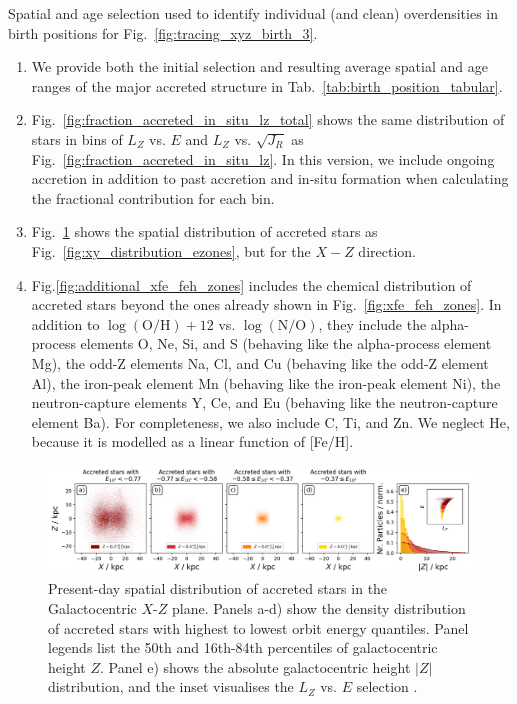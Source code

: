 \documentclass[fleqn,usenatbib]{mnras}
\begin{document}
\begin{table}
    \centering
    \caption{Spatial and age selection used to identify individual (and clean) overdensities in birth positions for Fig.~\ref{fig:tracing_xyz_birth_3}.}
    
    \label{tab:birth_position_tabular}
\end{table}

\begin{enumerate}[leftmargin=2em,labelwidth=0em]
    \item We provide both the initial selection and resulting average spatial and age ranges of the major accreted structure in Tab.~\ref{tab:birth_position_tabular}.
    \item Fig.~\ref{fig:fraction_accreted_in_situ_lz_total} shows the same distribution of stars in bins of $L_Z$ vs. $E$ and $L_Z$ vs. $\sqrt{J_R}$ as Fig.~\ref{fig:fraction_accreted_in_situ_lz}. In this version, we include ongoing accretion in addition to past accretion and in-situ formation when calculating the fractional contribution for each bin. 
    \item Fig.~\ref{fig:xz_distribution_ezones} shows the spatial distribution of accreted stars as Fig.~\ref{fig:xy_distribution_ezones}, but for the $X-Z$ direction.
      \item Fig.\ref{fig:additional_xfe_feh_zones} includes the chemical distribution of accreted stars beyond the ones already shown in Fig.~\ref{fig:xfe_feh_zones}. In addition to $\log(\mathrm{O/H}) + 12$ vs. $\log(\mathrm{N/O})$, they include the alpha-process elements O, Ne, Si, and S (behaving like the alpha-process element Mg), the odd-Z elements Na, Cl, and Cu (behaving like the odd-Z element Al), the iron-peak element Mn (behaving like the iron-peak element Ni), the neutron-capture elements Y, Ce, and Eu (behaving like the neutron-capture element Ba). For completeness, we also include C, Ti, and Zn. We neglect He, because it is modelled as a linear function of [Fe/H].
\end{enumerate}

\begin{figure}
    \centering
    \includegraphics[width=\textwidth]{figures/xz_distribution_ezones.png}
    \caption{Present-day spatial distribution of accreted stars in the Galactocentric $X$-$Z$ plane. Panels a-d) show the density distribution of accreted stars with highest to lowest orbit energy quantiles. Panel legends list the 50th and 16th-84th percentiles of galactocentric height $Z$. Panel e) shows the absolute galactocentric height $\vert Z \vert$ distribution, and the inset visualises the $L_Z$ vs. $E$ selection \href{https://github.com/svenbuder/gse_nihaouhd/tree/main/figures}{\faGithub}.}
    \label{fig:xz_distribution_ezones}
\end{figure}
\end{document}
